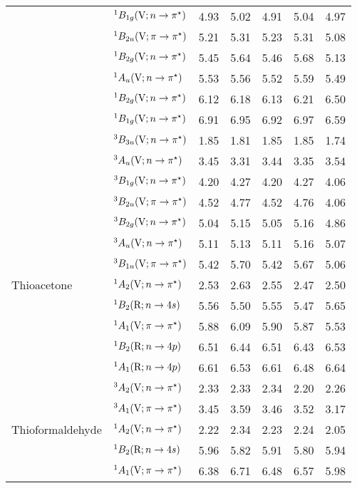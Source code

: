 \begin{tabular}{p{3.5cm}p{3.3cm}c|cccc}
        &$^1B_{1g}  (\mathrm{V}; n \rightarrow \pi^\star)$				& 4.93	&5.02	&4.91	&5.04	&4.97 \\	
        &$^1B_{2u}  (\mathrm{V}; \pi \rightarrow \pi^\star)$				& 5.21	&5.31	&5.23	&5.31	&5.08 \\	
        &$^1B_{2g}  (\mathrm{V}; n \rightarrow \pi^\star)$				& 5.45	&5.64	&5.46	&5.68	&5.13 \\	
        &$^1A_u    (\mathrm{V}; n \rightarrow \pi^\star)$				& 5.53	&5.56	&5.52	&5.59	&5.49 \\	
        &$^1B_{2g}  (\mathrm{V}; n \rightarrow \pi^\star)$				& 6.12	&6.18	&6.13	&6.21	&6.50 \\	
        &$^1B_{1g}  (\mathrm{V}; n \rightarrow \pi^\star)$				& 6.91	&6.95	&6.92	&6.97	&6.59 \\	
        &$^3B_{3u}  (\mathrm{V}; n \rightarrow \pi^\star)$				& 1.85	&1.81	&1.85	&1.85	&1.74 \\	
        &$^3A_u    (\mathrm{V}; n \rightarrow \pi^\star)$				& 3.45	&3.31	&3.44	&3.35	&3.54 \\	
        &$^3B_{1g}  (\mathrm{V}; n \rightarrow \pi^\star)$				& 4.20	&4.27	&4.20	&4.27	&4.06 \\	
        &$^3B_{2u}  (\mathrm{V}; \pi \rightarrow \pi^\star)$				& 4.52	&4.77	&4.52	&4.76	&4.06 \\	
        &$^3B_{2g}  (\mathrm{V}; n \rightarrow \pi^\star)$				& 5.04	&5.15	&5.05	&5.16	&4.86 \\	
        &$^3A_u    (\mathrm{V}; n \rightarrow \pi^\star)$				& 5.11	&5.13	&5.11	&5.16	&5.07 \\	
        &$^3B_{1u}  (\mathrm{V}; \pi \rightarrow \pi^\star)$				& 5.42	&5.70	&5.42	&5.67	&5.06 \\	
  Thioacetone	&$^1A_2 (\mathrm{V}; n \rightarrow \pi^\star)$					& 2.53 	&2.63	&2.55	&2.47	&2.50 \\	
        &$^1B_2 (\mathrm{R}; n \rightarrow 4s)$					& 5.56 	&5.50	&5.55	&5.47	&5.65\\
        &$^1A_1 (\mathrm{V}; \pi \rightarrow \pi^\star)$				& 5.88	&6.09	&5.90	&5.87	&5.53 \\	
        &$^1B_2 (\mathrm{R}; n \rightarrow 4p)$					& 6.51	&6.44	&6.51	&6.43	&6.53 \\	
        &$^1A_1 (\mathrm{R}; n \rightarrow 4p)$					& 6.61	&6.53	&6.61	&6.48	&6.64 \\	
        &$^3A_2 (\mathrm{V}; n \rightarrow \pi^\star)$					& 2.33 	&2.33	&2.34	&2.20	&2.26 \\	
        &$^3A_1 (\mathrm{V}; \pi \rightarrow \pi^\star)$				& 3.45	&3.59	&3.46	&3.52	&3.17 \\	
  Thioformaldehyde&$^1A_2 (\mathrm{V};n \rightarrow \pi^\star)$ 				&2.22	&2.34	&2.23	&2.24	&2.05	\\
        &$^1B_2 (\mathrm{R};n \rightarrow 4s)$ 					&5.96	&5.82	&5.91	&5.80	&5.94 	\\
        &$^1A_1 (\mathrm{V};\pi \rightarrow \pi^\star)$				&6.38	&6.71	&6.48	&6.57	&5.98 	\\

\end{tabular}
